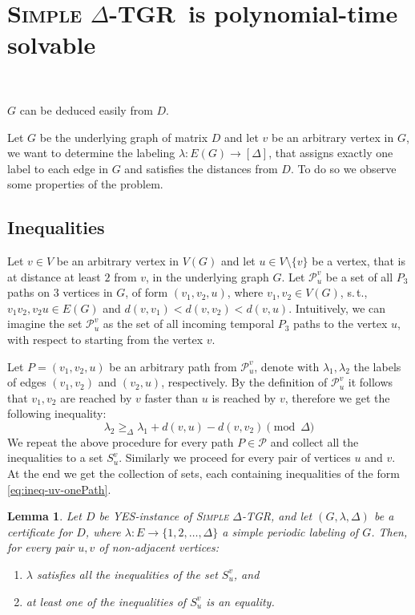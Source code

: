\documentclass[11pt,a4paper]{article}
\newtheorem{lemma}[theorem]{Lemma}
\theoremstyle{remark}
\theoremstyle{definition}
\newcommand{\st}{s.\,t.,\ }
\newcommand{\deltaExact}{\textsc{Simple $\Delta$-TGR}}
\begin{document}
\section{
\texorpdfstring{\deltaExact\ is polynomial-time solvable}
{\textsc{Simple Delta-TGR} is polynomial-time solvable}
}\

$G$ can be deduced easily from $D$.

	Let $G$ be the underlying graph of matrix $D$ and let $v$ be an arbitrary vertex in $G$, we want to determine the labeling $\lambda: E(G) \rightarrow [\Delta]$, that assigns exactly one label to each edge in $G$ and satisfies the distances from $D$.
	To do so we observe some properties of the problem.
	
\subsection*{Inequalities}
	
	Let $v \in V$ be an arbitrary vertex in $V(G)$ and let $u \in V \setminus \{v\}$ be a vertex, that is at distance at least $2$ from $v$, in the underlying graph $G$.
	Let $\mathcal{P}_{u}^v$ be a set of all $P_3$ paths on $3$ vertices in $G$, of form $(v_1, v_2, u)$, where $v_1, v_2 \in V(G)$, \st $v_1 v_2, v_2 u \in E(G)$ and $d(v,v_1) < d(v,v_2) < d(v,u)$. 
	Intuitively, we can imagine the set $\mathcal{P}_{u}^v$ as the set of all incoming temporal $P_3$ paths to the vertex $u$, with respect to starting from the vertex $v$.
	
	Let $P = (v_1,v_2,u)$ be an arbitrary path from $\mathcal{P}_u^v$, denote with $\lambda_1, \lambda_2$ the labels of edges $(v_1,v_2)$ and $(v_2, u)$, respectively.
	By the definition of $\mathcal{P}_u^v$ it follows that $v_1, v_2$ are reached by $v$ faster than $u$ is reached by $v$, therefore we get the following inequality:
	\begin{equation}\label{eq:ineq-uv-onePath}
	    \lambda_2 \geq_\Delta \lambda_1 + d(v,u)-d(v,v_2) \pmod \Delta
	\end{equation}
	We repeat the above procedure for every path $P \in \mathcal{P}$ and collect all the inequalities to a set $S_u^v$.
	Similarly we proceed for every pair of vertices $u$ and $v$.
	At the end we get the collection of sets, each containing inequalities of the form \cref{eq:ineq-uv-onePath}.
	
	\begin{lemma}
	\label{claim:exact-setsOfInequalities}
    Let $D$ be \textsc{YES}-instance of \textsc{Simple $\Delta$-TGR}, and let 
$(G,\lambda,\Delta)$ be a certificate for $D$, where $\lambda:E\rightarrow \{1,2,\ldots,\Delta\}$ a simple periodic labeling of $G$. Then, for every pair $u,v$ of non-adjacent vertices:
	\begin{enumerate}
	    \item \label{itemize:Claim-exact-AtLeastOneEquality-1} $\lambda$ satisfies all the inequalities of the set $S_u^v$, and 
	    \item \label{itemize:Claim-exact-AtLeastOneEquality} at least one of the inequalities of $S_u^v$ is an equality.
	\end{enumerate}
	\end{lemma}
\end{document}
